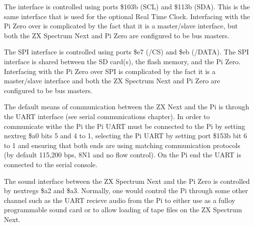 

The \iic interface is controlled using ports \$103b (SCL) and \$113b
(SDA). This is the same \iic interface that is used for the optional
Real Time Clock. Interfacing with the Pi Zero over \iic is
complicated by the fact that it is a master/slave interface, but both
the ZX Spectrum Next and Pi Zero are configured to be bus masters.




The SPI interface is controlled using ports \$e7 (/CS) and \$eb
(/DATA). The SPI interface is shared between the SD card(s), the flash
memory, and the Pi Zero. Interfacing with the Pi Zero over SPI is
complicated by the fact it is a master/slave interface and both the ZX
Spectrum Next and Pi Zero are configured to be bus masters.




The default means of communication between the ZX Next and the Pi is
through the UART interface (see serial communications chapter). In
order to communicate withe the Pi the Pi UART must be connected to the
Pi by setting nextreg \$a0 bits 5 and 4 to 1, selecting the Pi UART by
setting port \$153b bit 6 to 1 and ensuring that both ends are using
matching communication protocols (by default 115,200 bps, 8N1 and no
flow control). On the Pi end the UART is connected to the serial
console.



The \iis sound interface between the ZX Spectrum Next and the Pi Zero
is controlled by nextregs \$a2 and \$a3. Normally, one would control
the Pi through some other channel such as the UART recieve audio from
the Pi to either use as a fulloy programmable sound card or to allow
loading of tape files on the ZX Spectrum Next.



